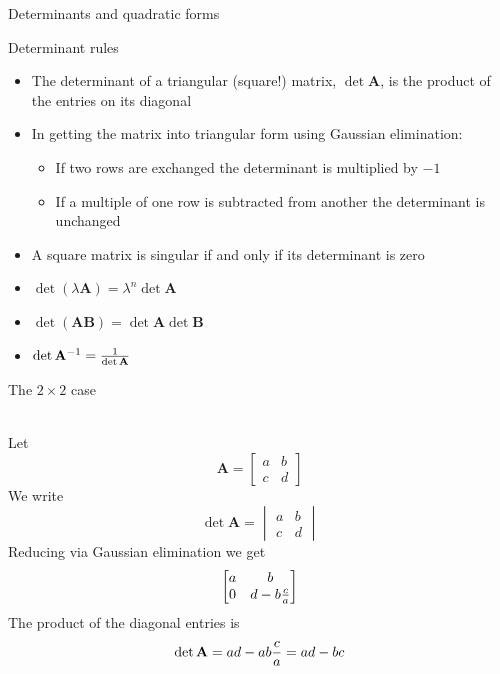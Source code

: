 \documentclass[10pt]{seminar}
\begin{document}
\newtheorem{proposition}{Proposition}

\newtheorem{definition}{Definition}

\newtheorem{corollary}{Corollary}

\newtheorem{theorem}{Theorem}

\newtheorem{lemma}{Lemma}

\def\argmax{\mathop{\rm argmax}\limits}  



\sffamily 


\begin{slide}
\begin{center}

Determinants and quadratic forms
 \end{center}
 
 \newslide
 \small 
 
 Determinant rules
 
 \begin{itemize}
 \item The determinant of a triangular (square!) matrix, $\det \mathbf{A}$,  is the product of the entries on its diagonal
 \item In getting the matrix into triangular form using Gaussian elimination:
 \begin{itemize}
 \item If two rows are exchanged the determinant is multiplied by $-1$
 \item If a multiple of one row is subtracted from another the determinant is unchanged

 \end{itemize}
 \item A square matrix is singular if and only if its determinant is zero
 \item $\det (\lambda \mathbf{A})=\lambda^n \det {\mathbf{A}}$
 \item $\det (\mathbf{AB})=\det \mathbf{A} \det \mathbf{B}$
 \item $\det\mathbf{A}^{-1}={1\over {\det \mathbf{A}}}$
 \end{itemize}
 
 \newslide
 
The $2\times 2$ case
 
\ \\Let $$\mathbf{A}=\begin{bmatrix}a&b\\c&d
\end{bmatrix}$$
We write $$\det\mathbf{A}=\begin{vmatrix}a&b\\c&d
\end{vmatrix}$$ Reducing via Gaussian elimination we get
 $$\begin{bmatrix}a&b\\0&d-b{c\over a}
\end{bmatrix}$$
 The product of the diagonal entries is $$\det{\mathbf{A}}=ad-{{ab}}{c\over a} = ad-bc$$


\end{slide}
\end{document}
